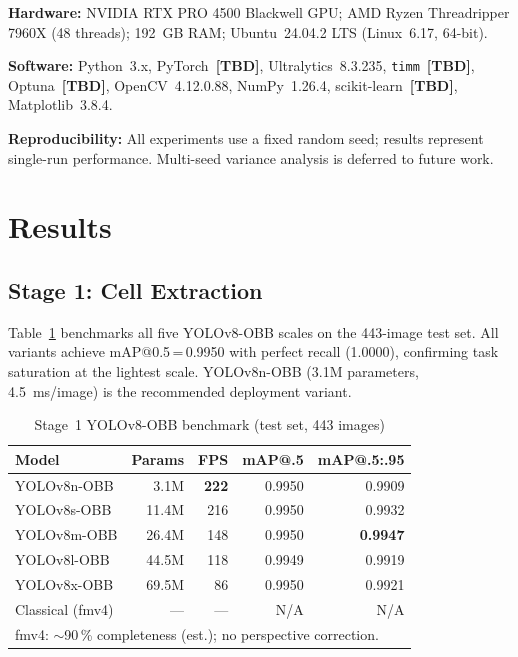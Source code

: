 \documentclass[conference]{IEEEtran}
\begin{document}
\textbf{Hardware:} NVIDIA RTX PRO 4500 Blackwell GPU; AMD Ryzen Threadripper 7960X (48 threads); 192~GB RAM; Ubuntu~24.04.2 LTS (Linux~6.17, 64-bit).

\textbf{Software:} Python~3.x, PyTorch~\textbf{[TBD]}, Ultralytics~8.3.235, \texttt{timm}~\textbf{[TBD]}, Optuna~\textbf{[TBD]}, OpenCV~4.12.0.88, NumPy~1.26.4, scikit-learn~\textbf{[TBD]}, Matplotlib~3.8.4.

\textbf{Reproducibility:} All experiments use a fixed random seed; results represent single-run performance. Multi-seed variance analysis is deferred to future work.

\section{Results}
\label{sec:results}

\subsection{Stage 1: Cell Extraction}

Table~\ref{tab:stage1_results} benchmarks all five YOLOv8-OBB scales on the 443-image test set. All variants achieve mAP@0.5\,=\,0.9950 with perfect recall (1.0000), confirming task saturation at the lightest scale. YOLOv8n-OBB (3.1M parameters, 4.5~ms/image) is the recommended deployment variant.

\begin{table}[t]
  \caption{Stage~1 YOLOv8-OBB benchmark (test set, 443 images)}
  \label{tab:stage1_results}
  \begin{center}
  \renewcommand{\arraystretch}{1.05}\small
  \begin{tabular}{lrrrr}
    \toprule
    \textbf{Model} & \textbf{Params} & \textbf{FPS} & \textbf{mAP@.5} & \textbf{mAP@.5:.95}\\
    \midrule
    YOLOv8n-OBB & 3.1M  & \textbf{222} & 0.9950 & 0.9909\\
    YOLOv8s-OBB & 11.4M & 216          & 0.9950 & 0.9932\\
    YOLOv8m-OBB & 26.4M & 148          & 0.9950 & \textbf{0.9947}\\
    YOLOv8l-OBB & 44.5M & 118          & 0.9949 & 0.9919\\
    YOLOv8x-OBB & 69.5M & 86           & 0.9950 & 0.9921\\
    \midrule
    Classical (fmv4) & --- & --- & N/A & N/A\\
    \bottomrule
    \multicolumn{5}{l}{\footnotesize fmv4: $\sim$90\,\% completeness (est.); no perspective correction.}
  \end{tabular}
  \end{center}
\end{table}
\end{document}
